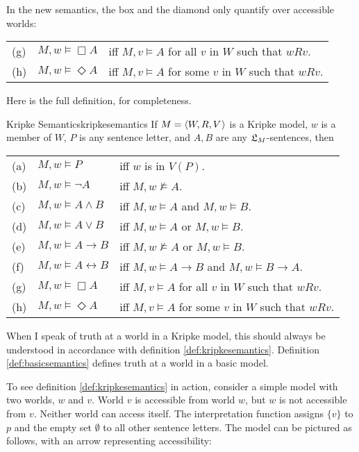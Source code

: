 \noindent%
In the new semantics, the box and the diamond only quantify over
accessible worlds:

\bigskip
\begin{tabular}{lll}
  (g) & $M,w \models \Box A$ &iff $M,v \models A$ for all $v$ in $ W$ such that $wRv$.\\
  (h) & $M,w \models \Diamond A$ &iff $M,v \models A$ for some $v$ in $ W$ such that $wRv$.
\end{tabular}
\bigskip

Here is the full definition, for completeness.

\begin{definition}{Kripke Semantics}{kripkesemantics}
  If $\Mfr = \t{W,R,V}$ is a Kripke model, $w$ is a member of $W$, $P$ is
  any sentence letter, and $A,B$ are any $\mathfrak{L}_M$-sentences, then

  \medskip
  \begin{tabular}{lll}
    (a) & $M,w \models P$ &iff $w$ is in $V(P)$.\\
    (b) & $M,w \models \neg A$ &iff $M,w \not\models A$.\\
    (c) & $M,w \models A \land B$ &iff $M,w \models A$ and $M,w \models B$.\\
    (d) & $M,w \models A \lor B$ &iff $M,w \models A$ or $M,w \models B$.\\
    (e) & $M,w \models A \to B$ &iff $M,w \not\models A$ or $M,w \models B$.\\
    (f) & $M,w \models A \leftrightarrow B$ &iff $M,w \models A\to B$ and $M,w \models B\to A$.\\
    (g) & $M,w \models \Box A$ &iff $M,v \models A$ for all $v$ in $ W$ such that $wRv$.\\
    (h) & $M,w \models \Diamond A$ &iff $M,v \models A$ for some $v$ in $ W$ such that $wRv$.
  \end{tabular}
\end{definition}
%
When I speak of truth at a world in a Kripke model, this should always be
understood in accordance with definition \ref{def:kripkesemantics}. Definition
\ref{def:basicsemantics} defines truth at a world in a basic model.

To see definition \ref{def:kripkesemantics} in action, consider a simple model
with two worlds, $w$ and $v$. World $v$ is accessible from world $w$, but $w$ is
not accessible from $v$. Neither world can access itself. The interpretation
function assigns $\{ v \}$ to $p$ and the empty set $\emptyset$ to all other
sentence letters. The model can be pictured as follows, with an arrow
representing accessibility:

